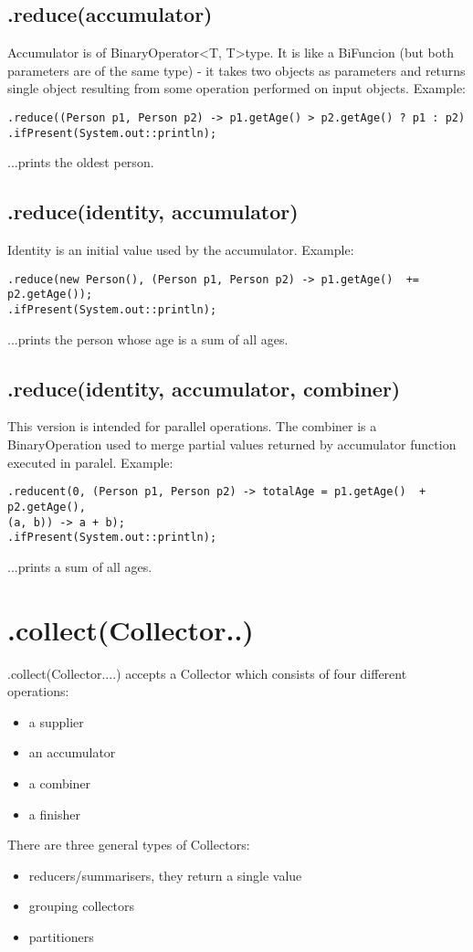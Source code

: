 \documentclass{report}
\begin{document}
\subsection{.reduce(accumulator)}
Accumulator is of BinaryOperator\textless T, T\textgreater type. It is  like a BiFuncion (but both parameters are of the same type) 
- it takes two objects as parameters and returns single object resulting from some operation performed on input
objects. Example:
\begin{verbatim}
.reduce((Person p1, Person p2) -> p1.getAge() > p2.getAge() ? p1 : p2)
.ifPresent(System.out::println);
\end{verbatim}
...prints the oldest person.

\subsection{.reduce(identity, accumulator)}
Identity is an initial value used by the accumulator. Example:
\begin{verbatim}
.reduce(new Person(), (Person p1, Person p2) -> p1.getAge()  += p2.getAge());
.ifPresent(System.out::println);
\end{verbatim}
...prints the person whose age is a sum of all ages.

\subsection{.reduce(identity, accumulator, combiner)}
This version is intended for parallel operations. The combiner is a BinaryOperation used to merge partial values returned
by accumulator function executed in paralel. Example:
\begin{verbatim}
.reducent(0, (Person p1, Person p2) -> totalAge = p1.getAge()  + p2.getAge(),
(a, b)) -> a + b); 
.ifPresent(System.out::println);
\end{verbatim}
...prints a sum of all ages.


\section{.collect(Collector..)}
.collect(Collector....)  accepts a Collector which consists of four different operations: 
\begin{itemize}
	\item a supplier
	\item an accumulator
	\item a combiner  
	\item a finisher
\end{itemize}
There are three general types of Collectors:
\begin{itemize}
	\item reducers/summarisers, they return a single value
	\item grouping collectors
	\item partitioners
\end{itemize}
\end{document}
